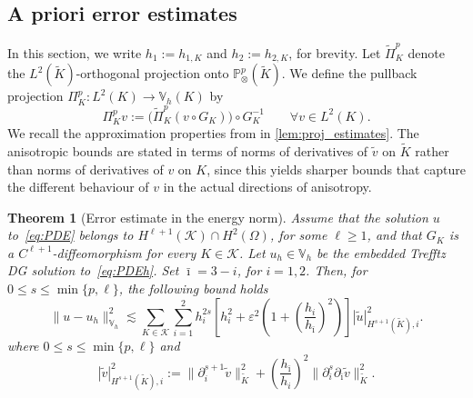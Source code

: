 \documentclass[a4paper,twoside,10pt]{article}
\newtheorem{theorem}{Theorem}[section]
\newcommand{\eps}{\varepsilon}
\newcommand{\IP}{\mathbb{P}}
\newcommand{\calK}{\mathcal{K}}
\numberwithin{equation}{section}
\newcommand{\Vh}{\mathbb{V}_{\! h}}
\newcommand{\Kt}{\widetilde{K}}
\newcommand{\hKot}{h_{1,K}}
\newcommand{\hKtt}{h_{2,K}}
\begin{document}
	\subsection{A priori error estimates}\label{sec:apriori}
	In this section, we write $h_1:=\hKot$ and $h_2:=\hKtt$, for brevity.
  	Let $\widetilde \Pi_K^p$ denote the $L^2(\widetilde K)$-orthogonal projection onto $\IP^p_\otimes(\widetilde K)$.  
    We define the pullback projection $\Pi_K^p:L^2(K)\to \Vh(K)$ by
    \[
    \Pi_K^p v := \bigl(\widetilde\Pi_K^p(v\circ G_K)\bigr)\circ G_K^{-1}\qquad \forall v \in L^2(K).
    \]
	We recall the approximation properties from \cite[Lemmas 7.5, 7.7, and 7.9]{G06hp} in \cref{lem:proj_estimates}.
	The anisotropic bounds are stated in terms of norms of derivatives of $\widetilde v$ on $\Kt$ rather than norms of derivatives of $v$ on $K$, since this yields sharper bounds that capture the different behaviour of $v$ in the actual directions of anisotropy.
	
\newcommand{\jj}{\bar\imath}
	\begin{theorem}[Error estimate in the energy norm]
		\label{thm:best_approximation}
        Assume that the solution $u$ to~\eqref{eq:PDE} belongs to $H^{\ell+1}(\calK)\cap H^2(\Omega)$, for some $\ell\ge 1$, and that 
		$G_K$ is a $C^{\ell+1}$-diffeomorphism for every $K\in\calK$.
		Let $u_h\in\Vh$ be the embedded Trefftz DG solution to~\eqref{eq:PDEh}.
        Set $\jj=3-i$, for $i=1,2$.
		Then, for $0\leq s\leq \min\{p,\ell\}$, the following bound holds
\begin{equation*}
\|u-u_h\|_{\Vh}^2
\lesssim
\sum_{K\in\calK}\sum_{i=1}^2 h_i^{2s} \left[ h_i^2 + \eps^2 \left( 1+\left(\frac{h_i}{h_{\jj}}\right)^2 \right) \right] |\widetilde u|_{H^{s+1}(\Kt),i}^2 .
\end{equation*}
		 where $0\leq s\leq \min\{p,\ell\}$ and 
\begin{equation*}
|\widetilde v|_{H^{s+1}(\Kt),i}^2 := \|\partial_i^{s+1}\widetilde v\|_{\Kt}^2 + \left(\frac{h_{\jj}}{h_i}\right)^2 \|\partial_i^s\partial_{\jj}\widetilde v\|_{\Kt}^2 .
\end{equation*}
	\end{theorem}
	
\end{document}
